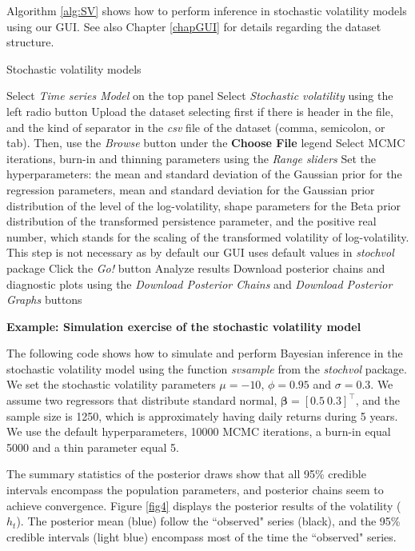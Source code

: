 Algorithm \ref{alg:SV} shows how to perform inference in stochastic volatility models using our GUI. See also Chapter \ref{chapGUI} for details regarding the dataset structure. 

\begin{algorithm}[h!]
	\caption{Stochastic volatility models}\label{alg:SV}
	\begin{algorithmic}[1]  		 			
		\State Select \textit{Time series Model} on the top panel
		\State Select \textit{Stochastic volatility} using the left radio button
		\State Upload the dataset selecting first if there is header in the file, and the kind of separator in the \textit{csv} file of the dataset (comma, semicolon, or tab). Then, use the \textit{Browse} button under the \textbf{Choose File} legend
		\State Select MCMC iterations, burn-in and thinning parameters using the \textit{Range sliders}
		\State Set the hyperparameters: the mean and standard deviation of the Gaussian prior for the regression parameters, mean and standard deviation for the Gaussian prior distribution of the level of the log-volatility, shape parameters for the Beta prior distribution of the transformed persistence parameter, and the positive real number, which stands for the scaling of the transformed volatility of log-volatility. This step is not necessary as by default our GUI uses default values in \textit{stochvol} package
		\State Click the \textit{Go!} button
		\State Analyze results
		\State Download posterior chains and diagnostic plots using the \textit{Download Posterior Chains} and \textit{Download Posterior Graphs} buttons
	\end{algorithmic} 
\end{algorithm}

\textbf{Example: Simulation exercise of the stochastic volatility model}

The following code shows how to simulate and perform Bayesian inference in the stochastic volatility model using the function \textit{svsample} from the \textit{stochvol} package. We set the stochastic volatility parameters $\mu=-10$, $\phi=0.95$ and $\sigma=0.3$. We assume two regressors that distribute standard normal, $\bm{\beta}=[0.5 \ 0.3]^{\top}$, and the sample size is 1250, which is approximately having daily returns during 5 years. We use the default hyperparameters, 10000 MCMC iterations, a burn-in equal 5000 and a thin parameter equal 5.

The summary statistics of the posterior draws show that all 95\% credible intervals encompass the population parameters, and posterior chains seem to achieve convergence. Figure \ref{fig4} displays the posterior results of the volatility ($h_t$). The posterior mean (blue) follow the ``observed" series (black), and the 95\% credible intervals (light blue) encompass most of the time the ``observed" series. 

